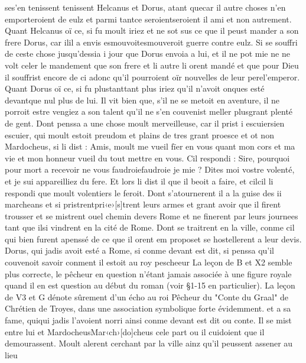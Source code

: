 \documentclass{article}
\begin{document}
\begin{pages}
   ses'en 
   tenissent
      tenissent Helcanus et Dorus, 
   atant quecar il autre choses n’en emporteroient de eulz et parmi 
   tantce 
   seroientseroient il ami et non autrement. 
   Quant Helcanus oï ce, si fu moult iriez et ne sot sus ce que 
   il peust mander 
   a son frere Dorus, 
   car ilil a envis 
   esmouvoitesmouveroit guerre contre eulz. 
   Si se souffri de ceste chose 
   jusqu’dessia i jour que 
   Dorus envoia a lui, et il ne pot mie ne ne volt celer le mandement que 
   son frere et li autre li orent mandé et que pour 
   Dieu il souffrist encore de ci adonc qu’il pourroient oïr nouvelles de 
   leur perel'emperor. 
   Quant Dorus oï ce, si fu 
   plustanttant plus iriez 
   qu’il n’avoit onques esté devantque nul plus de lui. 
   Il vit bien que, s’il ne se metoit en aventure, il ne porroit estre vengiez a son talent 
   qu’il ne s’en couvenist meller 
   plusgrant plenté de gent. 
   Dont penssa a une chose moult merveilleuse, car il prist i 
   escuiersien escuier, qui moult estoit preudom et plains de tres grant proesce et 
   ot non Mardocheus, si li dist :
   Amis, moult me vueil fïer en vous quant mon cors et ma vie et mon honneur vueil du tout mettre en vous.
   Cil respondi :
   Sire, pourquoi pour mort a 
      recevoir ne vous faudroiefaudroie je mie ? 
      Dites moi vostre volenté, et je sui appareilliez du fere.
   Et lors li dist il que il beoit a faire, et 
   cilcil li respondi que 
   moult volentiers le feroit. Dont s’atournerent il a la guise des ii marcheans 
   et si pristrentpri‹e›[s]trent leurs
   armes et grant avoir que il firent trousser et se mistrent ouel chemin 
   devers Rome 
   et ne finerent par leurs journees tant que ilsi vindrent en la cité de 
   Rome. Dont se traitrent en la ville, 
      conme cil qui bien furent apenssé de ce que il orent em proposet se hostellerent a leur devis. \pend
\pstart Dorus, qui jadis avoit esté a Rome, 
   si conme devant est dit, si penssa qu’il couvenoit savoir conment 
      il estoit au roy pescheeur 
      La leçon de B et X2 semble plus correcte, le pêcheur en question n'étant jamais associée à une 
         figure royale quand il en est question au début du roman (voir §1-15 en particulier). La leçon de V3 et G dénote sûrement 
         d'un écho au roi Pêcheur du "Conte du Graal" de Chrétien de Troyes, dans une association symbolique forte évidemment.
      et a sa fame, quiqui jadis 
      l’avoient norri ainsi conme devant est dit ou conte. 
   Il se mist entre lui et MardocheusMar‹ch›[do]cheus cele part ou il cuidoient que il demourassent. 
   Moult alerent cerchant par la ville ainz qu’il peussent assener au lieu 

\end{pages}
\end{document}
